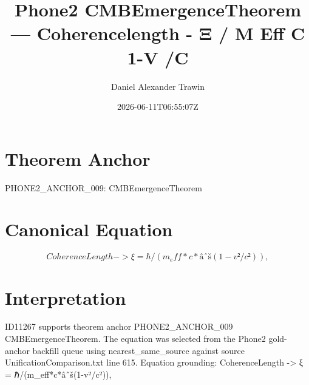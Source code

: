 \documentclass[11pt]{article}
\title{Phone2 CMBEmergenceTheorem — Coherencelength - Ξ / M Eff C 1-V /C}
\author{Daniel Alexander Trawin}
\date{2026-06-11T06:55:07Z}
\begin{document}
\maketitle
\section*{Theorem Anchor}
PHONE2_ANCHOR_009: CMBEmergenceTheorem
\section*{Canonical Equation}
\[
CoherenceLength -> ξ = ℏ/(m_eff*c*âˆš(1-v²/c²)),
\]
\section*{Interpretation}
ID11267 supports theorem anchor PHONE2_ANCHOR_009 CMBEmergenceTheorem. The equation was selected from the Phone2 gold-anchor backfill queue using nearest_same_source against source UnificationComparison.txt line 615. Equation grounding: CoherenceLength -> ξ = ℏ/(m_eff*c*âˆš(1-v²/c²)),
\end{document}
